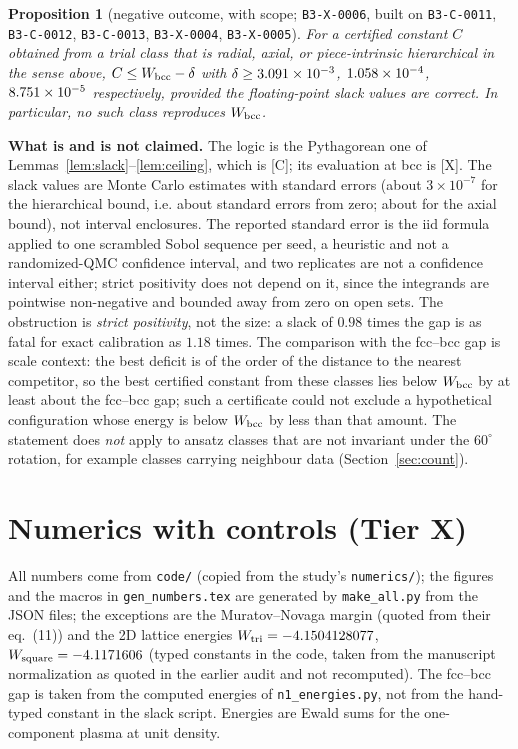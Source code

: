 \documentclass[10pt]{article}
\newcommand{\tier}[1]{\textsf{[#1]}}
\newcommand{\cid}[1]{\texttt{B3-#1}}
\newtheorem{proposition}{Proposition}
\theoremstyle{remark}
\begin{document}
\begin{proposition}[negative outcome, with scope; \cid{X-0006}, built on \cid{C-0011}, \cid{C-0012}, \cid{C-0013}, \cid{X-0004}, \cid{X-0005}]
For a certified constant $C$ obtained from a trial class that is radial, axial, or piece-intrinsic hierarchical in the sense above,
$C\le W_{\rm bcc}-\delta$ with $\delta\ge3.091\times10^{-3}$, $1.058\times10^{-4}$, $8.751\times10^{-5}$ respectively, \emph{provided the floating-point slack values are correct}.
In particular, no such class reproduces $W_{\rm bcc}$.
\end{proposition}
\textbf{What is and is not claimed.} The logic is the Pythagorean one of Lemmas~\ref{lem:slack}--\ref{lem:ceiling}, which is \tier{C}; its
evaluation at bcc is \tier{X}. The slack values are Monte Carlo estimates with standard errors (about $3\times10^{-7}$ for the hierarchical bound, i.e.
about \BNSigmaHier{} standard errors from zero; about \BNSigmaAx{} for the axial bound), not interval enclosures. The reported standard error is the iid formula applied to one scrambled Sobol sequence per seed, a heuristic and not a randomized-QMC confidence interval, and two replicates are not a confidence interval either; strict positivity does not depend on it, since the integrands are pointwise non-negative and bounded away from zero on open sets. The obstruction is
\emph{strict positivity}, not the size: a slack of $0.98$ times the gap is as fatal for exact calibration as $1.18$ times. The comparison with the fcc--bcc
gap is scale context: the best deficit is of the order of the distance to the nearest competitor, so the best certified constant from these classes lies below $W_{\rm bcc}$ by at least about the fcc--bcc gap; such a certificate could not exclude a hypothetical configuration whose energy is below $W_{\rm bcc}$ by less than that amount. The statement does \emph{not} apply to ansatz classes that are not invariant under the $60^\circ$ rotation, for example classes carrying neighbour data (Section~\ref{sec:count}).

\section{Numerics with controls (Tier X)}\label{sec:num}
All numbers come from \texttt{code/} (copied from the study's \texttt{numerics/}); the figures and the macros in \texttt{gen\_numbers.tex} are generated by \texttt{make\_all.py} from
the JSON files; the exceptions are the Muratov--Novaga margin (quoted from their eq.~(11)) and the 2D lattice energies $W_{\rm tri}=-4.1504128077$, $W_{\rm square}=-4.1171606$ (typed constants in the code, taken from the manuscript normalization as quoted in the earlier audit and not recomputed). The fcc--bcc gap is taken from the computed energies of \texttt{n1\_energies.py}, not from the hand-typed constant in the slack script. Energies are Ewald sums for the one-component plasma at unit density.
\end{document}
